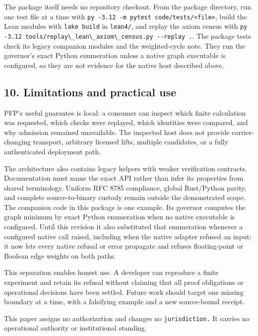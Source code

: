 \documentclass[
  11pt,
]{article}
\newcommand{\passthrough}[1]{#1}
\begin{document}
The package itself needs no repository checkout. From the package
directory, run one test file at a time with
\passthrough{\lstinline!py -3.12 -m pytest code/tests/<file>!}, build
the Lean modules with \passthrough{\lstinline!lake build!} in
\passthrough{\lstinline!lean4/!}, and replay the axiom census with
\passthrough{\lstinline!py -3.12 tools/replay\_lean\_axiom\_census.py --replay .!}.
The package tests check its legacy companion modules and the
weighted-cycle note. They run the governor's exact Python enumeration
unless a native graph executable is configured, so they are not evidence
for the native host described above.

\subsection{10. Limitations and practical
use}\label{limitations-and-practical-use}

PFP's useful guarantee is local: a consumer can inspect which finite
calculation was requested, which checks were replayed, which identities
were compared, and why admission remained unavailable. The inspected
host does not provide carrier-changing transport, arbitrary licensed
lifts, multiple candidates, or a fully authenticated deployment path.

The architecture also contains legacy helpers with weaker verification
contracts. Documentation must name the exact API rather than infer its
properties from shared terminology. Uniform RFC 8785 compliance, global
Rust/Python parity, and complete source-to-binary custody remain outside
the demonstrated scope. The companion code in this package is one
example. Its governor computes the graph minimum by exact Python
enumeration when no native executable is configured. Until this revision
it also substituted that enumeration whenever a configured native call
raised, including when the native adapter refused an input; it now lets
every native refusal or error propagate and refuses floating-point or
Boolean edge weights on both paths.

This separation enables honest use. A developer can reproduce a finite
experiment and retain its refusal without claiming that all proof
obligations or operational decisions have been settled. Future work
should target one missing boundary at a time, with a falsifying example
and a new source-bound receipt.

This paper assigns no authorization and changes no
\nolinkurl{jurisdiction.} It carries no operational authority or
institutional standing.
\end{document}
